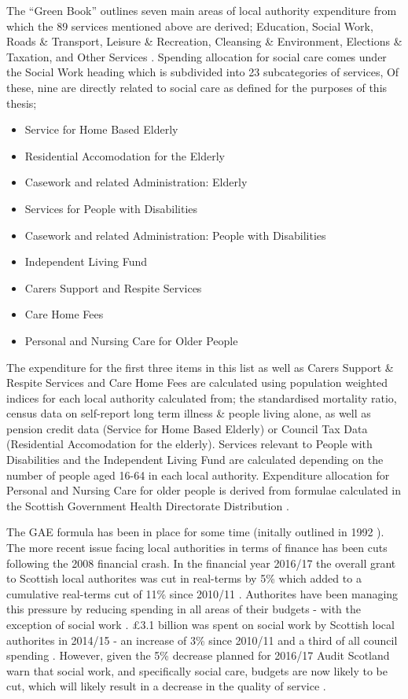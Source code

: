 \documentclass[12pt,]{report}
\begin{document}
The ``Green Book'' outlines seven main areas of local authority
expenditure from which the 89 services mentioned above are derived;
Education, Social Work, Roads \& Transport, Leisure \& Recreation,
Cleansing \& Environment, Elections \& Taxation, and Other Services
\citep{RN450}. Spending allocation for social care comes under the
Social Work heading which is subdivided into 23 subcategories of
services, Of these, nine are directly related to social care as defined
for the purposes of this thesis;

\begin{itemize}[noitemsep]
\item Service for Home Based Elderly
\item Residential Accomodation for the Elderly
\item Casework and related Administration: Elderly
\item Services for People with Disabilities
\item Casework and related Administration: People with Disabilities
\item Independent Living Fund
\item Carers Support and Respite Services
\item Care Home Fees
\item Personal and Nursing Care for Older People
\end{itemize}

The expenditure for the first three items in this list as well as Carers
Support \& Respite Services and Care Home Fees are calculated using
population weighted indices for each local authority calculated from;
the standardised mortality ratio, census data on self-report long term
illness \& people living alone, as well as pension credit data (Service
for Home Based Elderly) or Council Tax Data (Residential Accomodation
for the elderly). Services relevant to People with Disabilities and the
Independent Living Fund are calculated depending on the number of people
aged 16-64 in each local authority. Expenditure allocation for Personal
and Nursing Care for older people is derived from formulae calculated in
the Scottish Government Health Directorate Distribution \citep{RN450}.

The GAE formula has been in place for some time (initally outlined in
1992 \citep{RN450}). The more recent issue facing local authorities in
terms of finance has been cuts following the 2008 financial crash. In
the financial year 2016/17 the overall grant to Scottish local
authorites was cut in real-terms by 5\% which added to a cumulative
real-terms cut of 11\% since 2010/11 \citep{RN447}. Authorites have been
managing this pressure by reducing spending in all areas of their
budgets - with the exception of social work \citep{RN447}. £3.1 billion
was spent on social work by Scottish local authorites in 2014/15 - an
increase of 3\% since 2010/11 and a third of all council spending
\citep{RN446}. However, given the 5\% decrease planned for 2016/17 Audit
Scotland \citeyearpar{RN447} warn that social work, and specifically
social care, budgets are now likely to be cut, which will likely result
in a decrease in the quality of service \citep{RN446}.
\end{document}
